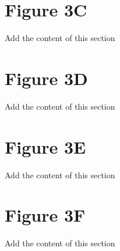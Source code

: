 \documentclass[10pt]{article}         %
\begin{document}
\newpage
\section{Figure 3C}
Add the content of this section

\newpage
\section{Figure 3D}
Add the content of this section

\newpage
\section{Figure 3E}
Add the content of this section

\newpage
\section{Figure 3F}
Add the content of this section

\newpage
\end{document}
